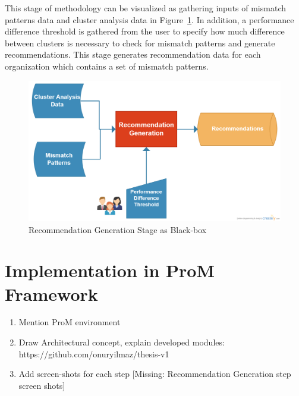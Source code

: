 This stage of methodology can be visualized as gathering inputs of mismatch patterns data and cluster analysis data in Figure~\ref{fig:recommendation-generation-blackox}. In addition, a performance difference threshold is gathered from the user to specify how much difference between clusters is necessary to check for mismatch patterns and generate recommendations. This stage generates recommendation data for each organization which contains a set of mismatch patterns.
\begin{figure}
  \centering
  \includegraphics[width=\textwidth]{4_methodology/recommendation-generation-blackbox}
  \caption{Recommendation Generation Stage as Black-box}
  \label{fig:recommendation-generation-blackox}
\end{figure}

\section{Implementation in ProM Framework}
\label{sec:implementation}
\begin{enumerate}
	\item Mention ProM environment
	\item Draw Architectural concept, explain developed modules: https://github.com/onuryilmaz/thesis-v1
	\item Add screen-shots for each step [Missing: Recommendation Generation step screen shots]
\end{enumerate}